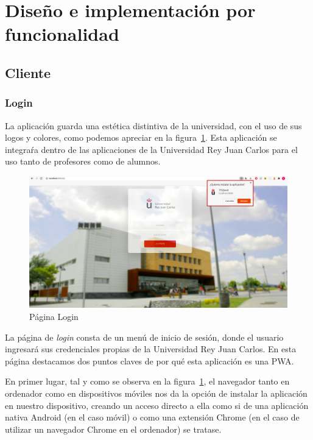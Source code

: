 \documentclass[a4paper, 12pt]{book}
\begin{document}
\section{Diseño e implementación por funcionalidad } 

\subsection{Cliente}

\subsubsection{Login}
	La aplicación guarda una estética distintiva de la universidad, con el uso de sus logos y colores, como podemos apreciar en la figura~\ref{fig:principalHome}. Esta aplicación se integraŕa dentro de las aplicaciones de la Universidad Rey Juan Carlos para el uso tanto de profesores como de alumnos.
	
	\begin{figure}[h!]
  	\centering
  	\includegraphics[width=16cm, keepaspectratio]{img/principalHome.png}
  	\caption{Página Login}\label{fig:principalHome}
	\end{figure}
	
La página de \textit{login} consta de un menú de inicio de sesión, donde el usuario ingresará sus credenciales propias de la Universidad Rey Juan Carlos. 
En esta página destacamos dos puntos claves de por qué esta aplicación es una PWA.
	
	En primer lugar, tal y como se observa en la figura~\ref{fig:principalHome}, el navegador tanto en ordenador como en dispositivos móviles nos da la opción de instalar la aplicación en nuestro dispositivo, creando un acceso directo a ella como si de una aplicación nativa Android (en el caso móvil) o como una extensión Chrome (en el caso de utilizar un navegador Chrome en el ordenador) se tratase.
\end{document}
